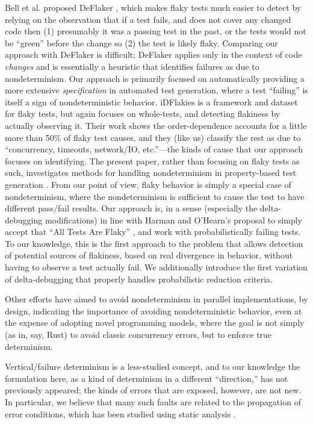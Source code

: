 Bell et al. proposed DeFlaker \cite{bell2018d}, which makes flaky tests much easier to detect by relying on the observation that if a test fails, and does not cover any changed code then (1) presumably it was a passing test in the past, or the tests would not be ``green'' before the change so (2) the test is likely flaky.  Comparing our approach with DeFlaker is difficult; DeFlaker applies only in the context of code \emph{changes} and is essentially a heuristic that identifies failures as due to nondeterminism.  Our approach is primarily focused on automatically providing a more extensive \emph{specification} in automated test generation, where a test ``failing'' is itself a sign of nondeterministic behavior.  iDFlakies \cite{idflakies} is a framework and dataset for flaky tests, but again focuses on whole-tests, and detecting flakiness by actually observing it.  Their work shows the order-dependence accounts for a little more than 50\% of flaky test causes, and they (like us) classify the rest as due to ``concurrency, timeouts,
network/IO, etc.''---the kinds of cause that our approach focuses on identifying.
The present paper, rather than focusing on flaky tests as such, investigates methods for handling nondeterminism in property-based test generation \cite{ClaessenH00,Papadakis:2011:PIT:2034654.2034663}.  From our point of view, flaky behavior is simply a special case of nondeterminism, where the nondeterminism is sufficient to cause the test to have different pass/fail results.  Our approach is, in a sense (especially the delta-debugging modifications) in line with Harman and O'Hearn's proposal to simply accept that ``All Tests Are Flaky'' \cite{StartupstoScaleups}, and work with probabilistically failing tests.  To our
knowledge, this is the first approach to the problem that
allows detection of potential sources of flakiness, based on real divergence in
behavior, without having to observe a test actually fail.  We additionally introduce the first variation of
delta-debugging that properly handles probabilistic reduction criteria.

Other efforts \cite{ParallelDeterministic} have aimed to avoid nondeterminism in parallel implementations, by design, indicating the importance of avoiding nondeterministic behavior, even at the expense of adopting novel programming models, where the goal is not simply (as in, say, Rust) to avoid classic concurrency errors, but to enforce true determinism.

Vertical/failure determinism is a less-studied concept, and to our knowledge the formulation here, as a kind of determinism in a different ``direction,'' has not previously appeared; the kinds of errors that are exposed, however, are not new.  In particular, we believe that many such faults are related to the propagation of error conditions, which has been studied using static analysis \cite{FileProp}.

